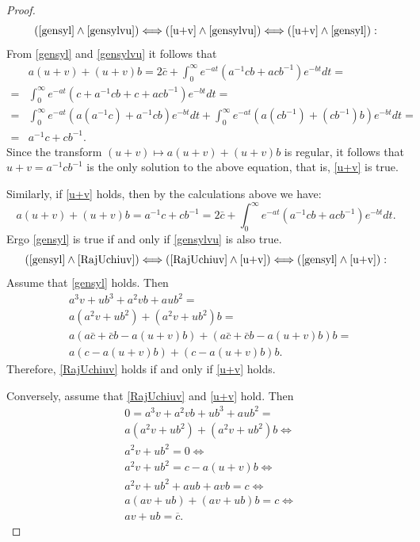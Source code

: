 \documentclass{article}
\theoremstyle{definition}
\begin{document}
\begin{proof}
$$\left(\eqref{gensyl}\wedge\eqref{gensylvu}\right) \Longleftrightarrow  \left(\eqref{u+v}\wedge\eqref{gensylvu}\right)
\Longleftrightarrow\left(\eqref{u+v}\wedge\eqref{gensyl}\right):$$
From \eqref{gensyl} and \eqref{gensylvu} it follows that
$$\begin{aligned}
&a(u+v) + (u+v)b
= 2\bar{c}
+ \int_0^\infty e^{-at}(a^{-1} cb + acb^{-1})e^{-bt}dt=\\
=& \int_0^\infty e^{-at}(c + a^{-1}cb + c + acb^{-1})e^{-bt}dt=\\
=&\int_0^\infty e^{-at}\left(a(a^{-1}c) + a^{-1}cb\right)e^{-bt}dt+\int_0^\infty e^{-at}\left(a(cb^{-1}) + (cb^{-1})b\right)e^{-bt}dt=\\
=& a^{-1}c + cb^{-1}.
\end{aligned}$$
Since the transform $(u+v)\mapsto a(u+v)+(u+v)b$ is regular, it follows that $u+v=a^{-1}cb^{-1}$ is the only solution to the above equation, that is, \eqref{u+v} is true. 

Similarly, if \eqref{u+v} holds, then by the calculations above we have:
$$a(u+v)+(u+v)b=a^{-1}c+cb^{-1}=2\bar{c}
+ \int_0^\infty e^{-at}(a^{-1} cb + acb^{-1})e^{-bt}dt.$$
Ergo \eqref{gensyl} is true if and only if \eqref{gensylvu} is also true. 
$$\left(\eqref{gensyl}\wedge\eqref{RajUchiuv}\right)\Longleftrightarrow\left(\eqref{RajUchiuv}\wedge\eqref{u+v}\right)\Longleftrightarrow\left(\eqref{gensyl}\wedge\eqref{u+v}\right):$$
Assume that \eqref{gensyl} holds. Then  $$\begin{aligned}
&a^3v+ub^3+a^2vb+aub^2=\\
&a(a^2v+ub^2)+(a^2v+ub^2)b=\\
&a\left(a\bar{c}+\bar{c}b-a(u+v)b\right)+\left(a\bar{c}+\bar{c}b-a(u+v)b\right)b=\\
&a\left(c-a(u+v)b\right)+\left(c-a(u+v)b\right)b.\end{aligned}$$ 
Therefore, \eqref{RajUchiuv} holds if and only if \eqref{u+v} holds.

Conversely, assume that \eqref{RajUchiuv} and \eqref{u+v} hold. Then 
$$\begin{aligned}
&0=a^3v+a^2vb+ub^3+aub^2=\\
&a(a^2v+ub^2)+(a^2v+ub^2)b\Leftrightarrow\\
&a^2v+ub^2=0\Leftrightarrow\\
&a^2v+ub^2=c-a(u+v)b\Leftrightarrow\\
&a^2v+ub^2+aub+avb=c\Leftrightarrow\\
&a(av+ub)+(av+ub)b=c\Leftrightarrow\\
&av+ub=\overline{c}.
\end{aligned}$$ 

\end{proof}
\end{document}
